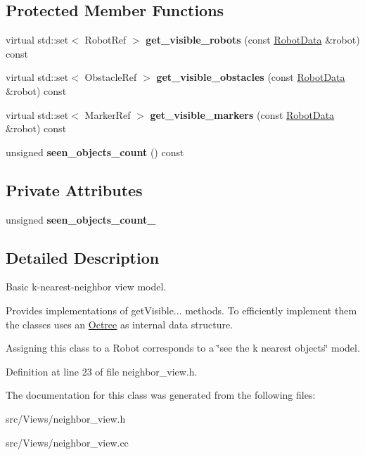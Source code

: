 \subsection*{Protected Member Functions}
\begin{CompactItemize}
\item 
\hypertarget{class_neighbor_view_f443b8f5e8dd1d6becc02d694fee24a8}{
virtual std::set$<$ RobotRef $>$ \textbf{get\_\-visible\_\-robots} (const \hyperlink{class_robot_data}{RobotData} \&robot) const }
\label{class_neighbor_view_f443b8f5e8dd1d6becc02d694fee24a8}

\item 
\hypertarget{class_neighbor_view_2ecce04a8e257db985ad626ed4a0188f}{
virtual std::set$<$ ObstacleRef $>$ \textbf{get\_\-visible\_\-obstacles} (const \hyperlink{class_robot_data}{RobotData} \&robot) const }
\label{class_neighbor_view_2ecce04a8e257db985ad626ed4a0188f}

\item 
\hypertarget{class_neighbor_view_32e118b43fcecba1bf78276f70717a5e}{
virtual std::set$<$ MarkerRef $>$ \textbf{get\_\-visible\_\-markers} (const \hyperlink{class_robot_data}{RobotData} \&robot) const }
\label{class_neighbor_view_32e118b43fcecba1bf78276f70717a5e}

\item 
\hypertarget{class_neighbor_view_1cbcfcdebfa7e573ef73536a0c8fec2c}{
unsigned \textbf{seen\_\-objects\_\-count} () const }
\label{class_neighbor_view_1cbcfcdebfa7e573ef73536a0c8fec2c}

\end{CompactItemize}
\subsection*{Private Attributes}
\begin{CompactItemize}
\item 
\hypertarget{class_neighbor_view_d5a3d924c1a46f2ebcbb06c17bdfbf9b}{
unsigned \textbf{seen\_\-objects\_\-count\_\-}}
\label{class_neighbor_view_d5a3d924c1a46f2ebcbb06c17bdfbf9b}

\end{CompactItemize}


\subsection{Detailed Description}
Basic k-nearest-neighbor view model. 

Provides implementations of getVisible... methods. To efficiently implement them the classes uses an \hyperlink{class_octree}{Octree} as internal data structure.

Assigning this class to a Robot corresponds to a \char`\"{}see the k nearest objects\char`\"{} model. 

Definition at line 23 of file neighbor\_\-view.h.

The documentation for this class was generated from the following files:\begin{CompactItemize}
\item 
src/Views/neighbor\_\-view.h\item 
src/Views/neighbor\_\-view.cc\end{CompactItemize}
